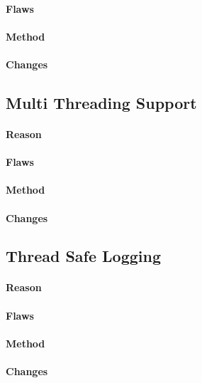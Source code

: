\paragraph{Flaws}
\paragraph{Method}
\paragraph{Changes}

\subsection{Multi Threading Support}
\paragraph{Reason}
\paragraph{Flaws}
\paragraph{Method}
\paragraph{Changes}

\subsection{Thread Safe Logging}
\paragraph{Reason}
\paragraph{Flaws}
\paragraph{Method}
\paragraph{Changes}

